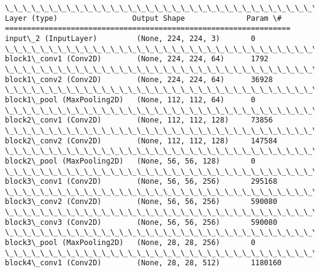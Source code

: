 \documentclass[11pt]{article}
\begin{document}
    \begin{Verbatim}[commandchars=\\\{\}]
\_\_\_\_\_\_\_\_\_\_\_\_\_\_\_\_\_\_\_\_\_\_\_\_\_\_\_\_\_\_\_\_\_\_\_\_\_\_\_\_\_\_\_\_\_\_\_\_\_\_\_\_\_\_\_\_\_\_\_\_\_\_\_\_\_
Layer (type)                 Output Shape              Param \#   
=================================================================
input\_2 (InputLayer)         (None, 224, 224, 3)       0         
\_\_\_\_\_\_\_\_\_\_\_\_\_\_\_\_\_\_\_\_\_\_\_\_\_\_\_\_\_\_\_\_\_\_\_\_\_\_\_\_\_\_\_\_\_\_\_\_\_\_\_\_\_\_\_\_\_\_\_\_\_\_\_\_\_
block1\_conv1 (Conv2D)        (None, 224, 224, 64)      1792      
\_\_\_\_\_\_\_\_\_\_\_\_\_\_\_\_\_\_\_\_\_\_\_\_\_\_\_\_\_\_\_\_\_\_\_\_\_\_\_\_\_\_\_\_\_\_\_\_\_\_\_\_\_\_\_\_\_\_\_\_\_\_\_\_\_
block1\_conv2 (Conv2D)        (None, 224, 224, 64)      36928     
\_\_\_\_\_\_\_\_\_\_\_\_\_\_\_\_\_\_\_\_\_\_\_\_\_\_\_\_\_\_\_\_\_\_\_\_\_\_\_\_\_\_\_\_\_\_\_\_\_\_\_\_\_\_\_\_\_\_\_\_\_\_\_\_\_
block1\_pool (MaxPooling2D)   (None, 112, 112, 64)      0         
\_\_\_\_\_\_\_\_\_\_\_\_\_\_\_\_\_\_\_\_\_\_\_\_\_\_\_\_\_\_\_\_\_\_\_\_\_\_\_\_\_\_\_\_\_\_\_\_\_\_\_\_\_\_\_\_\_\_\_\_\_\_\_\_\_
block2\_conv1 (Conv2D)        (None, 112, 112, 128)     73856     
\_\_\_\_\_\_\_\_\_\_\_\_\_\_\_\_\_\_\_\_\_\_\_\_\_\_\_\_\_\_\_\_\_\_\_\_\_\_\_\_\_\_\_\_\_\_\_\_\_\_\_\_\_\_\_\_\_\_\_\_\_\_\_\_\_
block2\_conv2 (Conv2D)        (None, 112, 112, 128)     147584    
\_\_\_\_\_\_\_\_\_\_\_\_\_\_\_\_\_\_\_\_\_\_\_\_\_\_\_\_\_\_\_\_\_\_\_\_\_\_\_\_\_\_\_\_\_\_\_\_\_\_\_\_\_\_\_\_\_\_\_\_\_\_\_\_\_
block2\_pool (MaxPooling2D)   (None, 56, 56, 128)       0         
\_\_\_\_\_\_\_\_\_\_\_\_\_\_\_\_\_\_\_\_\_\_\_\_\_\_\_\_\_\_\_\_\_\_\_\_\_\_\_\_\_\_\_\_\_\_\_\_\_\_\_\_\_\_\_\_\_\_\_\_\_\_\_\_\_
block3\_conv1 (Conv2D)        (None, 56, 56, 256)       295168    
\_\_\_\_\_\_\_\_\_\_\_\_\_\_\_\_\_\_\_\_\_\_\_\_\_\_\_\_\_\_\_\_\_\_\_\_\_\_\_\_\_\_\_\_\_\_\_\_\_\_\_\_\_\_\_\_\_\_\_\_\_\_\_\_\_
block3\_conv2 (Conv2D)        (None, 56, 56, 256)       590080    
\_\_\_\_\_\_\_\_\_\_\_\_\_\_\_\_\_\_\_\_\_\_\_\_\_\_\_\_\_\_\_\_\_\_\_\_\_\_\_\_\_\_\_\_\_\_\_\_\_\_\_\_\_\_\_\_\_\_\_\_\_\_\_\_\_
block3\_conv3 (Conv2D)        (None, 56, 56, 256)       590080    
\_\_\_\_\_\_\_\_\_\_\_\_\_\_\_\_\_\_\_\_\_\_\_\_\_\_\_\_\_\_\_\_\_\_\_\_\_\_\_\_\_\_\_\_\_\_\_\_\_\_\_\_\_\_\_\_\_\_\_\_\_\_\_\_\_
block3\_pool (MaxPooling2D)   (None, 28, 28, 256)       0         
\_\_\_\_\_\_\_\_\_\_\_\_\_\_\_\_\_\_\_\_\_\_\_\_\_\_\_\_\_\_\_\_\_\_\_\_\_\_\_\_\_\_\_\_\_\_\_\_\_\_\_\_\_\_\_\_\_\_\_\_\_\_\_\_\_
block4\_conv1 (Conv2D)        (None, 28, 28, 512)       1180160   

\end{Verbatim}
\end{document}

